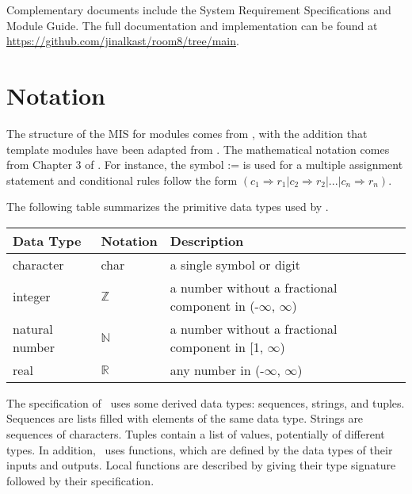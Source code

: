\documentclass[12pt, titlepage]{article}
\begin{document}
Complementary documents include the System Requirement Specifications
and Module Guide.  The full documentation and implementation can be
found at \url{https://github.com/jinalkast/room8/tree/main}.  

\section{Notation}


The structure of the MIS for modules comes from \citet{HoffmanAndStrooper1995},
with the addition that template modules have been adapted from
\cite{GhezziEtAl2003}.  The mathematical notation comes from Chapter 3 of
\citet{HoffmanAndStrooper1995}.  For instance, the symbol := is used for a
multiple assignment statement and conditional rules follow the form $(c_1
\Rightarrow r_1 | c_2 \Rightarrow r_2 | ... | c_n \Rightarrow r_n )$.

The following table summarizes the primitive data types used by \progname. 

\begin{center}
\renewcommand{\arraystretch}{1.2}
\noindent 
\begin{tabular}{l l p{7.5cm}} 
\toprule 
\textbf{Data Type} & \textbf{Notation} & \textbf{Description}\\ 
\midrule
character & char & a single symbol or digit\\
integer & $\mathbb{Z}$ & a number without a fractional component in (-$\infty$, $\infty$) \\
natural number & $\mathbb{N}$ & a number without a fractional component in [1, $\infty$) \\
real & $\mathbb{R}$ & any number in (-$\infty$, $\infty$)\\
\bottomrule
\end{tabular} 
\end{center}

\noindent
The specification of \progname \ uses some derived data types: sequences, strings, and
tuples. Sequences are lists filled with elements of the same data type. Strings
are sequences of characters. Tuples contain a list of values, potentially of
different types. In addition, \progname \ uses functions, which
are defined by the data types of their inputs and outputs. Local functions are
described by giving their type signature followed by their specification.
\end{document}
